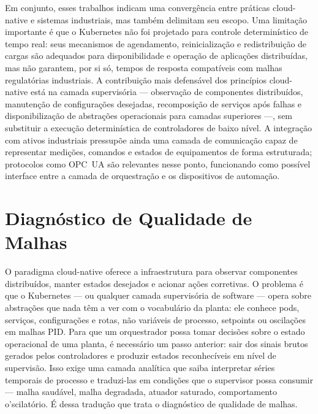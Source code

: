 Em conjunto, esses trabalhos indicam uma convergência entre práticas cloud-native e sistemas industriais, mas também delimitam seu escopo. Uma limitação importante é que o Kubernetes não foi projetado para controle determinístico de tempo real: seus mecanismos de agendamento, reinicialização e redistribuição de cargas são adequados para disponibilidade e operação de aplicações distribuídas, mas não garantem, por si só, tempos de resposta compatíveis com malhas regulatórias industriais. A contribuição mais defensável dos princípios cloud-native está na camada supervisória --- observação de componentes distribuídos, manutenção de configurações desejadas, recomposição de serviços após falhas e disponibilização de abstrações operacionais para camadas superiores ---, sem substituir a execução determinística de controladores de baixo nível. A integração com ativos industriais pressupõe ainda uma camada de comunicação capaz de representar medições, comandos e estados de equipamentos de forma estruturada; protocolos como OPC~UA são relevantes nesse ponto, funcionando como possível interface entre a camada de orquestração e os dispositivos de automação.


\section{Diagnóstico de Qualidade de Malhas}
\label{sec:diagnostico}

O paradigma cloud-native oferece a infraestrutura para observar componentes distribuídos, manter estados desejados e acionar ações corretivas. O problema é que o Kubernetes --- ou qualquer camada supervisória de software --- opera sobre abstrações que nada têm a ver com o vocabulário da planta: ele conhece pods, serviços, configurações e rotas, não variáveis de processo, setpoints ou oscilações em malhas PID. Para que um orquestrador possa tomar decisões sobre o estado operacional de uma planta, é necessário um passo anterior: sair dos sinais brutos gerados pelos controladores e produzir estados reconhecíveis em nível de supervisão. Isso exige uma camada analítica que saiba interpretar séries temporais de processo e traduzi-las em condições que o supervisor possa consumir --- malha saudável, malha degradada, atuador saturado, comportamento o'scilatório. É dessa tradução que trata o diagnóstico de qualidade de malhas.

